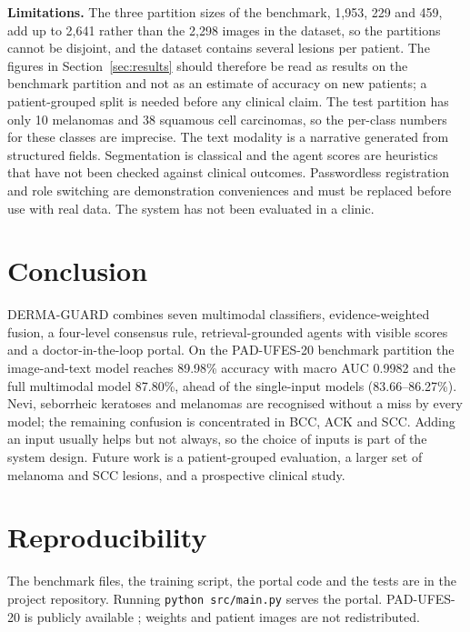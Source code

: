 \documentclass[conference]{IEEEtran}
\begin{document}
\textbf{Limitations.} The three partition sizes of the benchmark, 1,953, 229 and 459, add up to 2,641 rather than the 2,298 images in the dataset, so the partitions cannot be disjoint, and the dataset contains several lesions per patient. The figures in Section~\ref{sec:results} should therefore be read as results on the benchmark partition and not as an estimate of accuracy on new patients; a patient-grouped split is needed before any clinical claim. The test partition has only 10 melanomas and 38 squamous cell carcinomas, so the per-class numbers for these classes are imprecise. The text modality is a narrative generated from structured fields. Segmentation is classical and the agent scores are heuristics that have not been checked against clinical outcomes. Passwordless registration and role switching are demonstration conveniences and must be replaced before use with real data. The system has not been evaluated in a clinic.

\section{Conclusion}
DERMA-GUARD combines seven multimodal classifiers, evidence-weighted fusion, a four-level consensus rule, retrieval-grounded agents with visible scores and a doctor-in-the-loop portal. On the PAD-UFES-20 benchmark partition the image-and-text model reaches 89.98\% accuracy with macro AUC 0.9982 and the full multimodal model 87.80\%, ahead of the single-input models (83.66--86.27\%). Nevi, seborrheic keratoses and melanomas are recognised without a miss by every model; the remaining confusion is concentrated in BCC, ACK and SCC. Adding an input usually helps but not always, so the choice of inputs is part of the system design. Future work is a patient-grouped evaluation, a larger set of melanoma and SCC lesions, and a prospective clinical study.

\section*{Reproducibility}
The benchmark files, the training script, the portal code and the tests are in the project repository. Running \texttt{python src/main.py} serves the portal. PAD-UFES-20 is publicly available \cite{pacheco2020}; weights and patient images are not redistributed.
\end{document}
